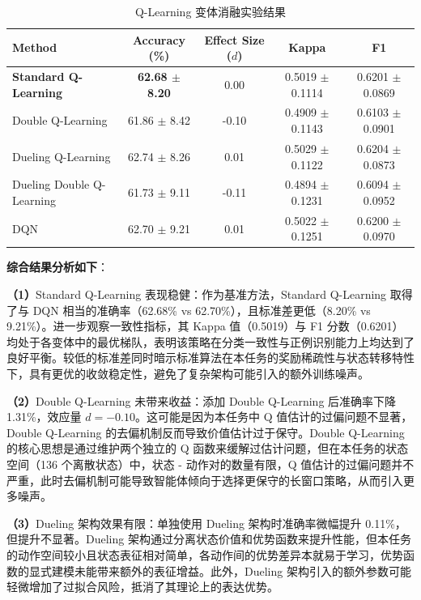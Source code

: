\begin{table}[H]
\centering
\caption{Q-Learning 变体消融实验结果}
\label{tab:ablation}
\small
\begin{tabular}{lcccc}
\hline
\textbf{Method} & \textbf{Accuracy (\%)}  & \textbf{Effect Size ($d$)} & \textbf{Kappa} & \textbf{F1} \\
\hline
\textbf{Standard Q-Learning} & \textbf{62.68 $\pm$ 8.20} & 0.00 & 0.5019 $\pm$ 0.1114 & 0.6201 $\pm$ 0.0869 \\
Double Q-Learning & 61.86 $\pm$ 8.42  & -0.10 & 0.4909 $\pm$ 0.1143 & 0.6103 $\pm$ 0.0901 \\
Dueling Q-Learning & 62.74 $\pm$ 8.26  & 0.01 & 0.5029 $\pm$ 0.1122 & 0.6204 $\pm$ 0.0873 \\
Dueling Double Q-Learning & 61.73 $\pm$ 9.11  & -0.11 & 0.4894 $\pm$ 0.1231 & 0.6094 $\pm$ 0.0952 \\
DQN & 62.70 $\pm$ 9.21  & 0.01 & 0.5022 $\pm$ 0.1251 & 0.6200 $\pm$ 0.0970 \\
\hline
\end{tabular}
\end{table}

\textbf{综合结果分析如下}：

\textbf{（1）}Standard Q-Learning 表现稳健：作为基准方法，Standard Q-Learning 取得了与 DQN 相当的准确率（62.68\% vs 62.70\%），且标准差更低（8.20\% vs 9.21\%）。进一步观察一致性指标，其 Kappa 值（0.5019）与 F1 分数（0.6201）均处于各变体中的最优梯队，表明该策略在分类一致性与正例识别能力上均达到了良好平衡。较低的标准差同时暗示标准算法在本任务的奖励稀疏性与状态转移特性下，具有更优的收敛稳定性，避免了复杂架构可能引入的额外训练噪声。

\textbf{（2）}Double Q-Learning 未带来收益：添加 Double Q-Learning 后准确率下降 1.31\%，效应量 $d = -0.10$。这可能是因为本任务中 Q 值估计的过偏问题不显著，Double Q-Learning 的去偏机制反而导致价值估计过于保守。Double Q-Learning 的核心思想是通过维护两个独立的 Q 函数来缓解过估计问题\cite{van2016deep}，但在本任务的状态空间（136 个离散状态）中，状态 - 动作对的数量有限，Q 值估计的过偏问题并不严重，此时去偏机制可能导致智能体倾向于选择更保守的长窗口策略，从而引入更多噪声。

\textbf{（3）}Dueling 架构效果有限：单独使用 Dueling 架构时准确率微幅提升 0.11\%，但提升不显著。Dueling 架构通过分离状态价值和优势函数来提升性能\cite{wang2016dueling}，但本任务的动作空间较小且状态表征相对简单，各动作间的优势差异本就易于学习，优势函数的显式建模未能带来额外的表征增益。此外，Dueling 架构引入的额外参数可能轻微增加了过拟合风险，抵消了其理论上的表达优势。

